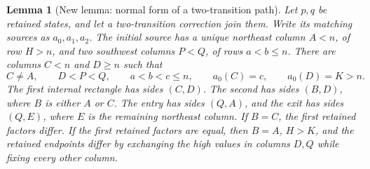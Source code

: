 \documentclass[11pt,oneside]{report}
\newtheorem{lemma}[theorem]{Lemma}
\theoremstyle{definition}
\numberwithin{equation}{section}
\begin{document}
\begin{lemma}[New lemma: normal form of a two-transition path]
\label{J06:lem:normal}
Let $p,q$ be retained states, and let a two-transition correction join
them. Write its matching sources as $a_0,a_1,a_2$.
The initial source has a unique northeast column $A<n$, of row $H>n$,
and two southwest columns $P<Q$, of rows $a<b\le n$.
There are columns $C<n$ and $D\ge n$ such that
\[
 C\ne A,\qquad D<P<Q,\qquad a<b<c\le n,
 \qquad a_0(C)=c,\qquad a_0(D)=K>n.
\]
The first internal rectangle has sides $(C,D)$.
The second has sides $(B,D)$, where $B$ is either $A$ or $C$.
The entry has sides $(Q,A)$, and the exit has sides $(Q,E)$, where
$E$ is the remaining northeast column.
If $B=C$, the first retained factors differ.
If the first retained factors are equal, then $B=A$, $H>K$, and the
retained endpoints differ by exchanging the high values in columns
$D,Q$ while fixing every other column.
\end{lemma}
\end{document}
